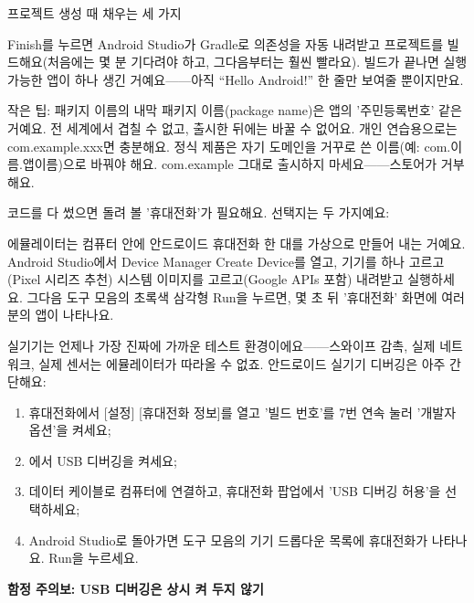 \begin{center}\small\color{gray}프로젝트 생성 때 채우는 세 가지\end{center}

Finish를 누르면 Android Studio가 Gradle로 의존성을 자동 내려받고 프로젝트를 빌드해요(처음에는 몇 분 기다려야 하고, 그다음부터는 훨씬 빨라요). 빌드가 끝나면 실행 가능한 앱이 하나 생긴 거예요——아직 “Hello Android!” 한 줄만 보여줄 뿐이지만요.

\begin{tcbinfo}{작은 팁: 패키지 이름의 내막}
패키지 이름(package name)은 앱의 '주민등록번호' 같은 거예요. 전 세계에서 겹칠 수 없고, 출시한 뒤에는 바꿀 수 없어요. 개인 연습용으로는 com.example.xxx면 충분해요. 정식 제품은 자기 도메인을 거꾸로 쓴 이름(예: com.이름.앱이름)으로 바꿔야 해요. com.example 그대로 출시하지 마세요——스토어가 거부해요.

\end{tcbinfo}


코드를 다 썼으면 돌려 볼 '휴대전화'가 필요해요. 선택지는 두 가지예요:


에뮬레이터는 컴퓨터 안에 안드로이드 휴대전화 한 대를 가상으로 만들어 내는 거예요. Android Studio에서 Device Manager Create Device를 열고, 기기를 하나 고르고(Pixel 시리즈 추천) 시스템 이미지를 고르고(Google APIs 포함) 내려받고 실행하세요. 그다음 도구 모음의 초록색 삼각형 Run을 누르면, 몇 초 뒤 '휴대전화' 화면에 여러분의 앱이 나타나요.


실기기는 언제나 가장 진짜에 가까운 테스트 환경이에요——스와이프 감촉, 실제 네트워크, 실제 센서는 에뮬레이터가 따라올 수 없죠. 안드로이드 실기기 디버깅은 아주 간단해요:

\begin{enumerate}
  \item 휴대전화에서 [설정] [휴대전화 정보]를 열고 '빌드 번호'를 7번 연속 눌러 '개발자 옵션'을 켜세요;
  \item [개발자 옵션]에서 USB 디버깅을 켜세요;
  \item 데이터 케이블로 컴퓨터에 연결하고, 휴대전화 팝업에서 'USB 디버깅 허용'을 선택하세요;
  \item Android Studio로 돌아가면 도구 모음의 기기 드롭다운 목록에 휴대전화가 나타나요. Run을 누르세요.
\end{enumerate}

\textbf{함정 주의보: USB 디버깅은 상시 켜 두지 않기}\par

